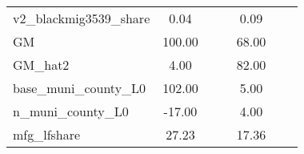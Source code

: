 \begin{table}[htbp]
\begin{tabular}{l*{2}{ccc}}
v2\_blackmig3539\_share&        0.04&            &            &        0.09&            &            \\
GM                  &      100.00&            &            &       68.00&            &            \\
GM\_hat2             &        4.00&            &            &       82.00&            &            \\
base\_muni\_county\_L0 &      102.00&            &            &        5.00&            &            \\
n\_muni\_county\_L0    &      -17.00&            &            &        4.00&            &            \\
mfg\_lfshare         &       27.23&            &            &       17.36&            &            \\
\bottomrule
\end{tabular}
\end{table}
